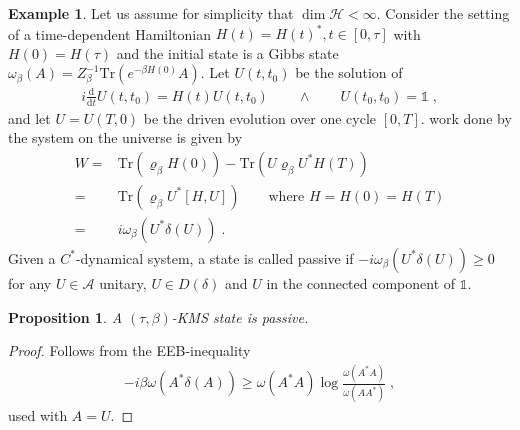 \documentclass[
a4paper, %
11pt, %
onecolumn, %
openany, %
]{memoir}
\theoremstyle{definition}
\newtheorem{example}{Example}[chapter]
\theoremstyle{remark}
\theoremstyle{plain}
\newtheorem{prop}{Proposition}[chapter]
\begin{document}
\begin{example}
Let us assume for simplicity that $\dim \mathcal{H}<\infty$. Consider the setting of a time-dependent Hamiltonian $H(t)=H(t)^*, t\in[0,\tau]$ with $H(0)=H(\tau)$ and the initial state is a Gibbs state $\omega_{\beta}(A)=Z_{\beta}^{-1}\mathrm{Tr}(e^{-\beta H(0)}A)$. Let $U(t,t_0)$ be the solution of \begin{align}
i\frac{\mathrm{d}}{\mathrm{d}t}U(t,t_0)=H(t)U(t,t_0) \qquad \land \qquad U(t_0,t_0)=\mathds{1}\; ,
\end{align}
and let $U=U(T,0)$ be the driven evolution over one cycle $[0,T]$. work done by the system on the universe is given by \begin{align}
W=&\mathrm{Tr}(\varrho_{\beta}H(0))-\mathrm{Tr}(U\varrho_{\beta}U^*H(T))\\
=& \mathrm{Tr}(\varrho_{\beta}U^*[H,U]) \qquad \text{where }H=H(0)=H(T)\\
=& i\omega_{\beta}(U^*\delta(U))\; .
\end{align}
Given a $C^*$-dynamical system, a state is called passive if $-i\omega_{\beta}(U^*\delta(U))\geq 0$ for any $U\in\mathcal{A}$ unitary, $U\in D(\delta)$ and $U$ in the connected component of $\mathds{1}$.\end{example}
\begin{prop}
A $(\tau,\beta)$-KMS state is passive.
\end{prop}
\begin{proof}
Follows from the EEB-inequality \begin{align}
-i\beta\omega(A^*\delta(A))\geq \omega(A^*A)\log\frac{\omega(A^*A)}{\omega(AA^*)}\; ,
\end{align}
used with $A=U$.\end{proof}
\end{document}
